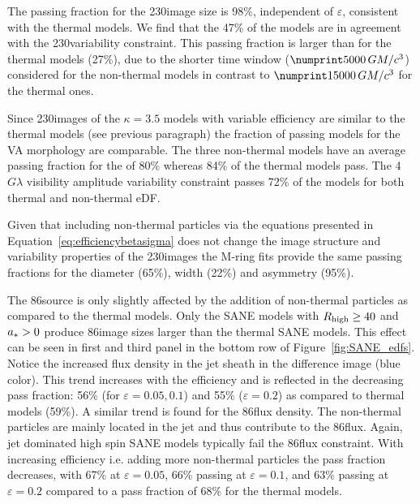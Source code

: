 The passing fraction for the 230\GHz image size is 98\%, independent of $\varepsilon$, consistent with the thermal models.
We find that the 47\% of the models are in agreement with the 230\GHz variability constraint.
This passing fraction is larger than for the thermal models (27\%), due to the shorter time window ($\no{5000}\,\tg$) considered for the non-thermal models in contrast to $\no{15000}\,\tg$ for the thermal ones.


Since 230\GHz images of the $\kappa=3.5$ models with variable efficiency are similar to the thermal models (see previous paragraph) the fraction of passing models for the VA morphology are comparable.
The three non-thermal models have an average passing fraction for the \vam of 80\% whereas 84\% of the thermal models pass.
The 4\,$G\lambda$ visibility amplitude variability constraint passes 72\% of the models for both thermal and non-thermal eDF.


Given that including non-thermal particles via the equations presented in Equation~\ref{eq:efficiencybetasigma} does not change the image structure and variability properties of the 230\GHz images the M-ring fits provide the same passing fractions for the diameter (65\%), width (22\%) and asymmetry (95\%).


The 86\GHz source is only slightly affected by the addition of non-thermal particles as compared to the thermal models.
Only the SANE models with $R_\mathrm{high} \geq 40$ and $a_* > 0$ produce 86\GHz image sizes larger than the thermal SANE models.
This effect can be seen in  first and third panel in the bottom row of Figure~\ref{fig:SANE_edfs}.
Notice the increased flux density in the jet sheath in the difference image (blue color).
This trend increases with the efficiency and is reflected in the decreasing pass fraction: 56\% (for $\varepsilon=0.05,0.1$) and 55\% ($\varepsilon=0.2$) as compared to thermal models (59\%).
A similar trend is found for the 86\GHz flux density.
The non-thermal particles are mainly located in the jet and thus contribute to the 86\GHz flux.
Again, jet dominated high spin SANE models typically fail the 86\GHz flux constraint.
With increasing efficiency i.e.
adding more non-thermal particles the pass fraction decreases, with 67\%  at $\varepsilon=0.05$, 66\% passing at $\varepsilon=0.1$, and 63\% passing at  $\varepsilon=0.2$ compared to a pass fraction of
68\% for the thermal models.


